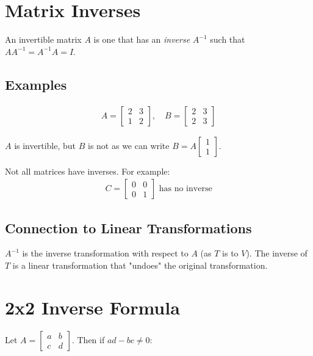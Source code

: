 \documentclass[12pt,a4paper]{article}
\begin{document}
\section{Matrix Inverses}

An invertible matrix $A$ is one that has an \textit{inverse} $A^{-1}$ such that $AA^{-1} = A^{-1}A = I$.

\subsection{Examples}

\begin{align*}
A = \begin{bmatrix} 2 & 3 \\ 1 & 2 \end{bmatrix}, \quad B = \begin{bmatrix} 2 & 3 \\ 2 & 3 \end{bmatrix}
\end{align*}

$A$ is invertible, but $B$ is not as we can write $B = A \begin{bmatrix} 1 \\ 1 \end{bmatrix}$.

Not all matrices have inverses. For example:
\begin{align*}
C = \begin{bmatrix} 0 & 0 \\ 0 & 1 \end{bmatrix} \text{ has no inverse}
\end{align*}

\subsection{Connection to Linear Transformations}

$A^{-1}$ is the inverse transformation with respect to $A$ (as $T$ is to $V$). The inverse of $T$ is a linear transformation that "undoes" the original transformation.

\section{2x2 Inverse Formula}

Let $A = \begin{bmatrix} a & b \\ c & d \end{bmatrix}$. Then if $ad-bc \neq 0$:
\end{document}
